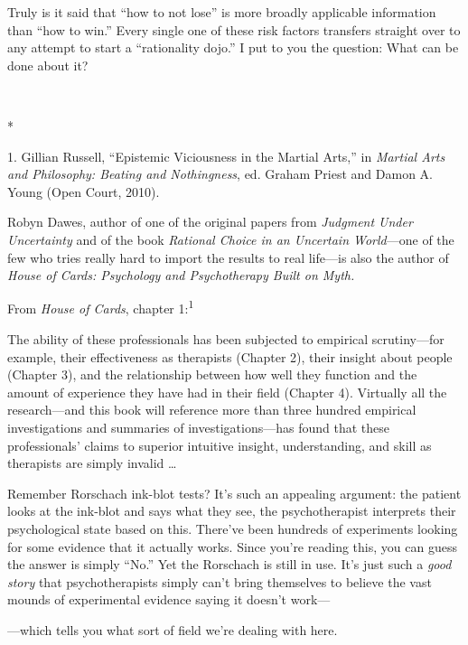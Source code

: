 {
 Truly is it said that ``how to not
lose'' is more broadly applicable information than
``how to win.'' Every single one of
these risk factors transfers straight over to any attempt to start a
``rationality dojo.'' I put to you
the question: What can be done about it?}

{\centering
 \ ~
\par}

{\centering
 *
\par}


\bigskip

{
 1. Gillian Russell, ``Epistemic Viciousness in
the Martial Arts,'' in \textit{Martial Arts and
Philosophy: Beating and Nothingness}, ed. Graham Priest and Damon A.
Young (Open Court, 2010).}


{
 Robyn Dawes, author of one of the original papers from
\textit{Judgment Under Uncertainty} and of the book \textit{Rational
Choice in an Uncertain World}{}---one of the few who tries really hard
to import the results to real life---is also the author of
\textit{House of Cards: Psychology and Psychotherapy Built on Myth.} }

{
 From \textit{House of Cards}, chapter 1:\textsuperscript{1}}

{
 The ability of these professionals has been subjected to empirical
scrutiny---for example, their effectiveness as therapists (Chapter 2),
their insight about people (Chapter 3), and the relationship between
how well they function and the amount of experience they have had in
their field (Chapter 4). Virtually all the research---and this book
will reference more than three hundred empirical investigations and
summaries of investigations---has found that these
professionals' claims to superior intuitive insight,
understanding, and skill as therapists are simply invalid \ldots}

{
 Remember Rorschach ink-blot tests? It's such an
appealing argument: the patient looks at the ink-blot and says what
they see, the psychotherapist interprets their psychological state
based on this. There've been hundreds of experiments
looking for some evidence that it actually works. Since
you're reading this, you can guess the answer is simply
``No.'' Yet the Rorschach is still
in use. It's just such a \textit{good story} that
psychotherapists simply can't bring themselves to
believe the vast mounds of experimental evidence saying it
doesn't work---}

{
 {}---which tells you what sort of field we're
dealing with here.}

